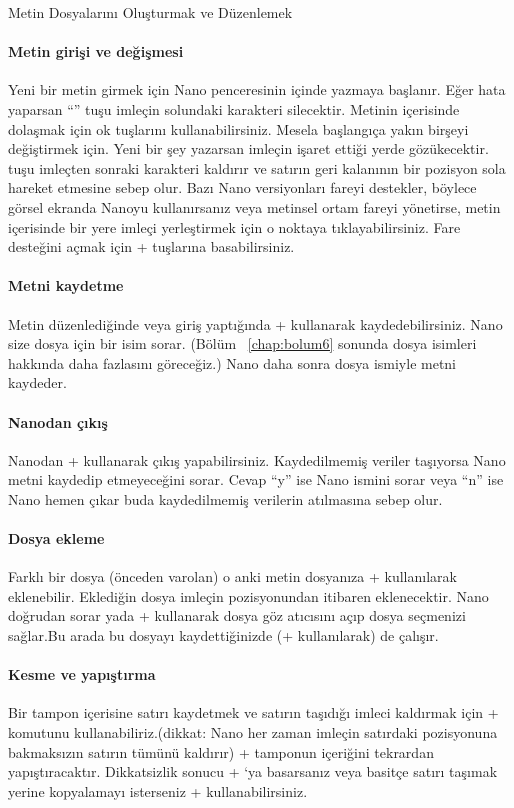 \begin{section}{Metin Dosyalarını Oluşturmak ve Düzenlemek}
\paragraph{Metin girişi ve değişmesi}{Yeni bir metin girmek için Nano penceresinin içinde yazmaya başlanır. Eğer hata yaparsan “\BSpace” tuşu imleçin solundaki karakteri silecektir. Metinin içerisinde dolaşmak için ok tuşlarını kullanabilirsiniz. Mesela başlangıça yakın birşeyi değiştirmek için. Yeni bir şey yazarsan imleçin işaret ettiği yerde gözükecektir. \Del tuşu imleçten sonraki karakteri kaldırır ve satırın geri kalanının bir pozisyon sola hareket etmesine sebep olur. Bazı Nano versiyonları fareyi destekler, böylece görsel ekranda Nanoyu kullanırsanız veya metinsel ortam fareyi yönetirse, metin içerisinde bir yere imleçi yerleştirmek için o noktaya tıklayabilirsiniz. Fare desteğini açmak için \Alt +  tuşlarına basabilirsiniz.}

\paragraph{Metni kaydetme}{ Metin düzenlediğinde veya giriş yaptığında \Ctrl +  kullanarak kaydedebilirsiniz. Nano size dosya için bir isim sorar. (Bölüm ~\ref{chap:bolum6} sonunda dosya isimleri hakkında daha fazlasını göreceğiz.) Nano daha sonra dosya ismiyle metni kaydeder.}

\paragraph{Nanodan çıkış}{ Nanodan \Ctrl +  kullanarak çıkış yapabilirsiniz. Kaydedilmemiş veriler taşıyorsa Nano metni kaydedip etmeyeceğini sorar. Cevap “y”  ise Nano ismini sorar veya “n” ise Nano hemen çıkar buda kaydedilmemiş verilerin atılmasına sebep olur.}
\paragraph{Dosya ekleme}{ Farklı bir dosya (önceden varolan) o anki metin dosyanıza \Ctrl +  kullanılarak eklenebilir.  Eklediğin dosya imleçin pozisyonundan itibaren eklenecektir. Nano doğrudan sorar yada \Ctrl +  kullanarak dosya göz atıcısını açıp dosya seçmenizi sağlar.Bu arada bu dosyayı kaydettiğinizde (\Ctrl +  kullanılarak) de çalışır. }
\paragraph{ Kesme ve yapıştırma}{ Bir tampon içerisine satırı kaydetmek ve satırın taşıdığı imleci kaldırmak için \Ctrl +  komutunu kullanabiliriz.(dikkat: Nano her zaman imleçin satırdaki pozisyonuna bakmaksızın satırın tümünü kaldırır) \Ctrl +  tamponun içeriğini tekrardan yapıştıracaktır. Dikkatsizlik sonucu \Ctrl + ‘ya basarsanız veya basitçe satırı taşımak yerine kopyalamayı isterseniz \Ctrl +  kullanabilirsiniz.}


\end{section}
